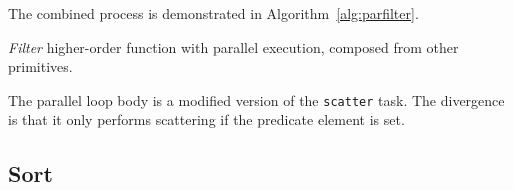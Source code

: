 The combined process is demonstrated in Algorithm~\ref{alg:parfilter}.

\begin{algorithm}
  \caption{\emph{Filter} higher-order function with parallel execution, composed from other primitives.}
  \label{alg:parfilter}

  \begin{algorithmic}
      \EndIf
    \EndPFor
    \EndFunction
  \end{algorithmic}
\end{algorithm}

The parallel loop body is a modified version of the \verb|scatter| task. The divergence is that it only performs scattering if the predicate element is set.

\subsection{Sort}
